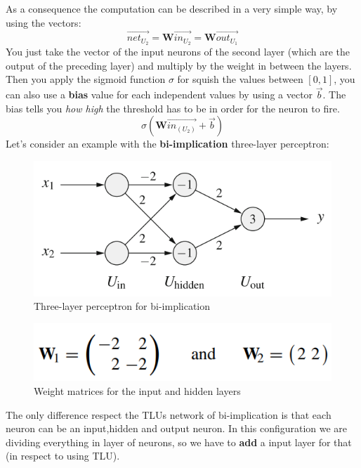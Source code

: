 \documentclass{article}
\begin{document}
As a consequence the computation can be described in a very simple way,
by using the vectors:
$$\vec{net_{U_2}}=\textbf{W}\vec{in_{U_2}}=\textbf{W}\vec{out_{U_1}}$$
You just take the vector of the input neurons of the second layer
(which are the output of the preceding layer) and multiply by the
weight in between the layers.
\newline\newline
Then you apply the sigmoid function $\sigma$ for squish the values between $[0,1]$,
you can also use a \textbf{bias} value for each independent values by using a vector $\vec{b}$.
The bias tells you \textit{how high} the threshold has to be in order for the neuron to fire.
$$\sigma\left(\textbf{W}\vec{in_{(U_2)}}+\vec{b}\right)$$
Let's consider an example with the \textbf{bi-implication}
three-layer perceptron:
\begin{figure}[H]
    \centering
    \includegraphics[scale=0.5]{images/three_layer_example.png}
    \caption{Three-layer perceptron for bi-implication}
\end{figure}
\begin{figure}[H]
    \centering
    \includegraphics[scale=0.5]{images/weights_three_layer_example.png}
    \caption{Weight matrices for the input and hidden layers}
\end{figure}
The only difference respect the TLUs network of bi-implication is that
each neuron can be an input,hidden and output neuron. In this configuration
we are dividing everything in layer of neurons, so we have to \textbf{add} a
input layer for that (in respect to using TLU).
\newline\newline
\end{document}
